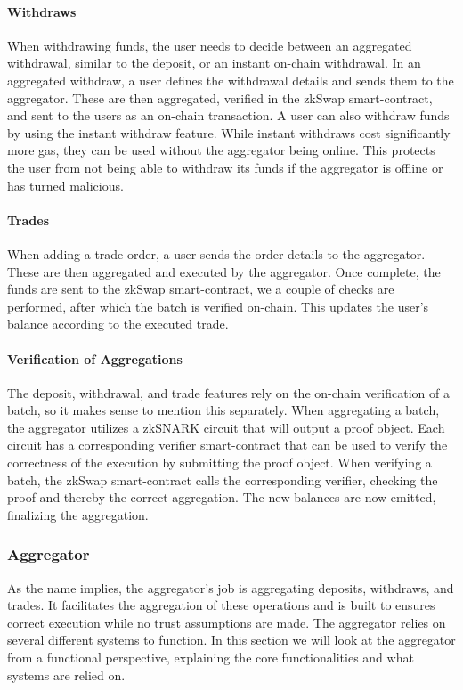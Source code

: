 \documentclass[../../thesis.tex]{subfiles}
\begin{document}
\paragraph{Withdraws}
When withdrawing funds, the user needs to decide between an aggregated withdrawal, similar to the deposit, or an instant on-chain withdrawal. In an aggregated withdraw, a user defines the withdrawal details and sends them to the aggregator. These are then aggregated, verified in the zkSwap smart-contract, and sent to the users as an on-chain transaction. A user can also withdraw funds by using the instant withdraw feature. While instant withdraws cost significantly more gas, they can be used without the aggregator being online. This protects the user from not being able to withdraw its funds if the aggregator is offline or has turned malicious.

\paragraph{Trades}
When adding a trade order, a user sends the order details to the aggregator. These are then aggregated and executed by the aggregator. Once complete, the funds are sent to the zkSwap smart-contract, we a couple of checks are performed, after which the batch is verified on-chain. This updates the user's balance according to the executed trade.

\paragraph{Verification of Aggregations}
The deposit, withdrawal, and trade features rely on the on-chain verification of a batch, so it makes sense to mention this separately. When aggregating a batch, the aggregator utilizes a zkSNARK circuit that will output a proof object. Each circuit has a corresponding verifier smart-contract that can be used to verify the correctness of the execution by submitting the proof object. When verifying a batch, the zkSwap smart-contract calls the corresponding verifier, checking the proof and thereby the correct aggregation. The new balances are now emitted, finalizing the aggregation.

\subsubsection{Aggregator}
As the name implies, the aggregator's job is aggregating deposits, withdraws, and trades. It facilitates the aggregation of these operations and is built to ensures correct execution while no trust assumptions are made. The aggregator relies on several different systems to function. In this section we will look at the aggregator from a functional perspective, explaining the core functionalities and what systems are relied on.
\end{document}
